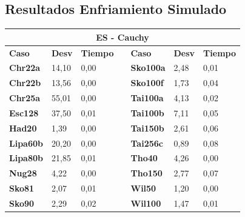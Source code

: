 \documentclass[a4paper, 12pt]{article}
\begin{document}
      \newpage
      \subsection{Resultados Enfriamiento Simulado}
      \begin{table}[H]
\centering
\begin{tabular}{|l|l|l|l|l|l|l|}
\hline
\multicolumn{7}{|c|}{\textbf{ES - Cauchy}}                                                                          \\ \hline
\textbf{Caso}    & \textbf{Desv} & \textbf{Tiempo} & \textbf{} & \textbf{Caso}    & \textbf{Desv} & \textbf{Tiempo} \\ \cline{1-3} \cline{5-7} 
\textbf{Chr22a}  & 14,10         & 0,00            &           & \textbf{Sko100a} & 2,48          & 0,01            \\ \cline{1-3} \cline{5-7} 
\textbf{Chr22b}  & 13,56         & 0,00            &           & \textbf{Sko100f} & 1,73          & 0,04            \\ \cline{1-3} \cline{5-7} 
\textbf{Chr25a}  & 55,01         & 0,00            &           & \textbf{Tai100a} & 4,13          & 0,02            \\ \cline{1-3} \cline{5-7} 
\textbf{Esc128}  & 37,50         & 0,01            &           & \textbf{Tai100b} & 7,11          & 0,05            \\ \cline{1-3} \cline{5-7} 
\textbf{Had20}   & 1,39          & 0,00            &           & \textbf{Tai150b} & 2,61          & 0,06            \\ \cline{1-3} \cline{5-7} 
\textbf{Lipa60b} & 20,20         & 0,00            &           & \textbf{Tai256c} & 0,89          & 0,08            \\ \cline{1-3} \cline{5-7} 
\textbf{Lipa80b} & 21,85         & 0,01            &           & \textbf{Tho40}   & 4,26          & 0,00            \\ \cline{1-3} \cline{5-7} 
\textbf{Nug28}   & 4,22          & 0,00            &           & \textbf{Tho150}  & 2,77          & 0,07            \\ \cline{1-3} \cline{5-7} 
\textbf{Sko81}   & 2,07          & 0,01            &           & \textbf{Wil50}   & 1,20          & 0,00            \\ \cline{1-3} \cline{5-7} 
\textbf{Sko90}   & 2,29          & 0,02            &           & \textbf{Wil100}  & 1,47          & 0,01            \\ \cline{1-3} \cline{5-7} 
\end{tabular}
\end{table}
\end{document}
